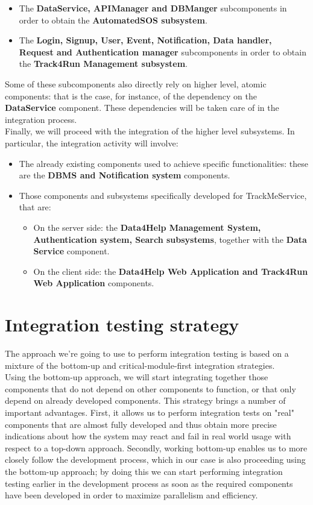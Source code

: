\documentclass[a4paper, hidelinks, 12pt]{report}
\begin{document}
	\begin{itemize}
	\item{} The \textbf{DataService, APIManager and DBManger} subcomponents in order to obtain the \textbf{AutomatedSOS subsystem}.
	\item{} The \textbf{Login, Signup, User, Event, Notification, Data handler, Request and  Authentication manager} subcomponents in order to obtain the \textbf{Track4Run Management subsystem}.
	\end{itemize}
		Some of these subcomponents also directly rely on higher level, atomic components: that is the case, for instance, of the dependency on the \textbf{DataService} component. These dependencies will be taken care of in the integration process.\\
		
		Finally, we will proceed with the integration of the higher level subsystems. In particular, the integration activity will involve:
	\begin{itemize}
	\item{} The already existing components used to achieve
specific functionalities: these are the \textbf{DBMS and Notification system} components.
\item{} Those components and subsystems specifically developed for TrackMeService, that are:

	\begin{itemize}
	\item{} On the server side: the \textbf{Data4Help Management System, Authentication system, Search subsystems}, together with the \textbf{Data Service} component.
	\item{} On the client side: the \textbf{Data4Help Web Application and Track4Run Web Application} components.
	\end{itemize}
			
	\end{itemize}
	
	\section{Integration testing strategy}
	The approach we're going to use to perform integration testing is based on a mixture of the bottom-up and critical-module-first integration strategies.\\
	
	Using the bottom-up approach, we will start integrating together those components that do not depend on other components to function, or that only depend on already developed components. This strategy brings a number of important advantages. First, it allows us to perform integration tests on "real" components that are almost fully developed and thus obtain more precise indications about how the system may react and fail in real world usage with respect to a top-down approach. Secondly, working bottom-up enables us to more closely follow the development process, which in our case is also proceeding using the bottom-up approach; by doing this we can start performing integration testing earlier in the development process as soon as the required components have been developed in order to maximize parallelism and efficiency.\\
	
\end{document}
